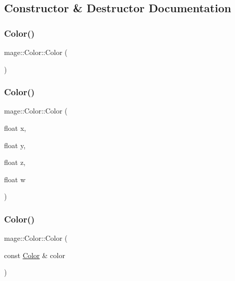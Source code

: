 \subsection{Constructor \& Destructor Documentation}
\hypertarget{structmage_1_1_color_aacf48e59425346eb80e7592bbcd6b55d}{}\label{structmage_1_1_color_aacf48e59425346eb80e7592bbcd6b55d} 
\subsubsection{\texorpdfstring{Color()}{Color()}\hspace{0.1cm}{\footnotesize\ttfamily [1/6]}}
{\footnotesize\ttfamily mage\+::\+Color\+::\+Color (\begin{DoxyParamCaption}{ }\end{DoxyParamCaption})}

\hypertarget{structmage_1_1_color_ae906a0c456f1d21df8a6d5476918a913}{}\label{structmage_1_1_color_ae906a0c456f1d21df8a6d5476918a913} 
\subsubsection{\texorpdfstring{Color()}{Color()}\hspace{0.1cm}{\footnotesize\ttfamily [2/6]}}
{\footnotesize\ttfamily mage\+::\+Color\+::\+Color (\begin{DoxyParamCaption}\item[{float}]{x,  }\item[{float}]{y,  }\item[{float}]{z,  }\item[{float}]{w }\end{DoxyParamCaption})}

\hypertarget{structmage_1_1_color_aabf202b6ec0c2d1fc788c9bc69f185ff}{}\label{structmage_1_1_color_aabf202b6ec0c2d1fc788c9bc69f185ff} 
\subsubsection{\texorpdfstring{Color()}{Color()}\hspace{0.1cm}{\footnotesize\ttfamily [3/6]}}
{\footnotesize\ttfamily mage\+::\+Color\+::\+Color (\begin{DoxyParamCaption}\item[{const \hyperlink{structmage_1_1_color}{Color} \&}]{color }\end{DoxyParamCaption})}

